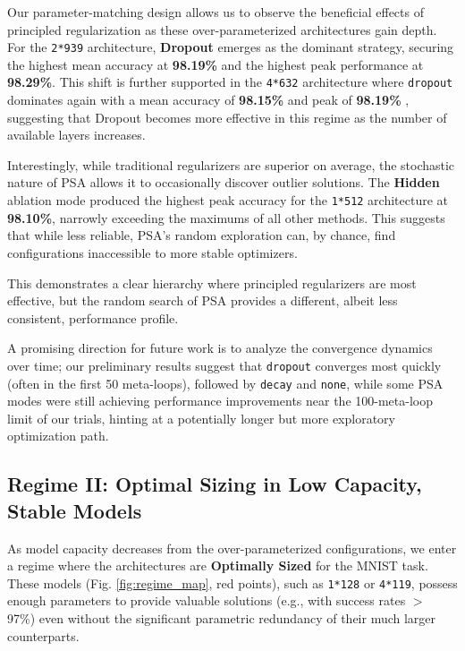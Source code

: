 \documentclass[conference]{IEEEtran}
\begin{document}
Our parameter-matching design allows us to observe the beneficial effects of principled regularization as these over-parameterized architectures gain depth. For the \texttt{2*939} architecture, \textbf{Dropout} emerges as the dominant strategy, securing the highest mean accuracy at \textbf{98.19\%} and the highest peak performance at \textbf{98.29\%}. This shift is further supported in the \texttt{4*632} architecture where \verb|dropout| dominates again with a mean accuracy of \textbf{98.15\%} and peak of \textbf{98.19\%} , suggesting that Dropout becomes more effective in this regime as the number of available layers increases.

Interestingly, while traditional regularizers are superior on average, the stochastic nature of PSA allows it to occasionally discover outlier solutions. The \textbf{Hidden} ablation mode produced the highest peak accuracy for the \texttt{1*512} architecture at \textbf{98.10\%}, narrowly exceeding the maximums of all other methods. This suggests that while less reliable, PSA's random exploration can, by chance, find configurations inaccessible to more stable optimizers.

This demonstrates a clear hierarchy where principled regularizers are most effective, but the random search of PSA provides a different, albeit less consistent, performance profile.

A promising direction for future work is to analyze the convergence dynamics over time; our preliminary results suggest that \verb|dropout| converges most quickly (often in the first 50 meta-loops), followed by \verb|decay| and \verb|none|, while some PSA modes were still achieving performance improvements near the 100-meta-loop limit of our trials, hinting at a potentially longer but more exploratory optimization path.

\subsection{Regime II: Optimal Sizing in Low Capacity, Stable Models}

As model capacity decreases from the over-parameterized configurations, we enter a regime where the architectures are \textbf{Optimally Sized} for the MNIST task. These models (Fig. \ref{fig:regime_map}, red points), such as \texttt{1*128} or \texttt{4*119}, possess enough parameters to provide valuable solutions (e.g., with success rates $>$ 97\%) even without the significant parametric redundancy of their much larger counterparts.
\end{document}
